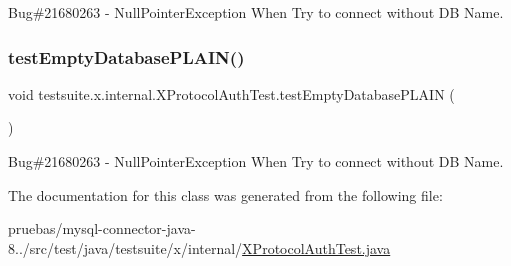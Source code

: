 Bug\#21680263 -\/ Null\+Pointer\+Exception When Try to connect without DB Name. \mbox{\label{classtestsuite_1_1x_1_1internal_1_1_x_protocol_auth_test_a0399a6526726159d237bed0441d195c2}} 
\subsubsection{\texorpdfstring{test\+Empty\+Database\+P\+L\+A\+I\+N()}{testEmptyDatabasePLAIN()}}
{\footnotesize\ttfamily void testsuite.\+x.\+internal.\+X\+Protocol\+Auth\+Test.\+test\+Empty\+Database\+P\+L\+A\+IN (\begin{DoxyParamCaption}{ }\end{DoxyParamCaption})}

Bug\#21680263 -\/ Null\+Pointer\+Exception When Try to connect without DB Name. 

The documentation for this class was generated from the following file\+:\begin{DoxyCompactItemize}
\item 
pruebas/mysql-\/connector-\/java-\/8../src/test/java/testsuite/x/internal/\mbox{\hyperlink{_x_protocol_auth_test_8java}{X\+Protocol\+Auth\+Test.\+java}}\end{DoxyCompactItemize}

